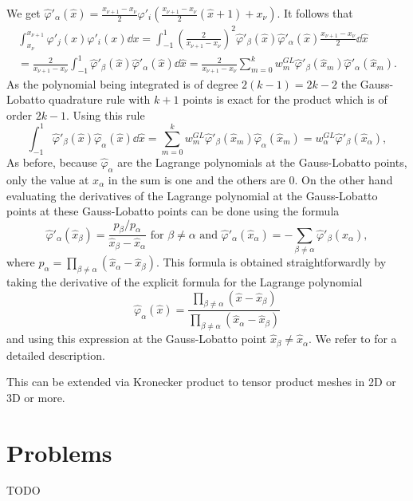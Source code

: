 We get $ \hat{\varphi}'_\alpha(\hat{x}) =\frac{x_{\nu+1}-x_\nu}{2}
 \varphi'_i(\frac{x_{\nu+1}-x_\nu}{2}(\hat{x}+1) +x_\nu)$. 
It follows that
\begin{multline*}
 \int_{x_\nu}^{x_{\nu+1}} \varphi'_j(x)\varphi'_i(x)\dd x = 
 \int_{-1}^1 
\left( \frac{2}{x_{\nu+1}-x_\nu}\right)^2\hat{\varphi}'_\beta(\hat{x})\hat{\varphi}'_\alpha(\hat{x})\frac{x_{\nu+1}-x_\nu}{2}\dd \hat{x}\\
 =\frac{2}{x_{\nu+1}-x_\nu} \int_{-1}^1 
 \hat{\varphi}'_\beta(\hat{x})\hat{\varphi}'_\alpha(\hat{x})\dd \hat{x}=\frac{2}{x_{\nu+1}-x_\nu} \sum_{m=0}^k w^{GL}_m  \hat{\varphi}'_\beta(\hat{x}_m)\hat{\varphi}'_\alpha(\hat{x}_m).
 \end{multline*}
 As the polynomial being integrated is of degree $2(k-1)=2k-2$ the Gauss-Lobatto quadrature rule with $k+1$ points is exact for the product which is of order $2k-1$. Using this rule
$$ \int_{-1}^1  \hat{\varphi}'_\beta(\hat{x})\hat{\varphi}_\alpha(\hat{x})\dd \hat{x}
=\sum_{m=0}^k w^{GL}_m  \hat{\varphi}'_\beta(\hat{x}_m)\hat{\varphi}_\alpha(\hat{x}_m)
=w^{GL}_\alpha  \hat{\varphi}'_\beta(\hat{x}_\alpha),$$
As before, because $\hat{\varphi}_\alpha$ are the Lagrange polynomials at the Gauss-Lobatto points, only the value at $x_\alpha$  in the sum is one and the others are 0.
On the other hand evaluating the derivatives of the Lagrange polynomial at the Gauss-Lobatto points at these Gauss-Lobatto points can be done using the formula
$$\hat{\varphi}'_\alpha(\hat{x}_\beta) = \frac{p_\beta/p_\alpha}{\hat{x}_\beta-\hat{x}_\alpha} \mbox{ for }\beta\neq \alpha \mbox{ and }  \hat{\varphi}'_\alpha(\hat{x}_\alpha)=-\sum_{\beta\neq \alpha} \hat{\varphi}'_\beta(\hat{x}_\alpha),$$
where $p_\alpha= \prod_{\beta\neq\alpha} (\hat{x}_\alpha -\hat{x}_\beta) $. 
This formula is obtained straightforwardly by taking the derivative of the explicit formula for the Lagrange polynomial 
$$ \hat{\varphi}_\alpha(\hat{x})=\frac{\displaystyle \prod_{\beta\neq\alpha} (\hat{x} -\hat{x}_\beta)}{
\displaystyle \prod_{\beta\neq\alpha} (\hat{x}_\alpha -\hat{x}_\beta)}$$
and using this expression at the Gauss-Lobatto point $\hat{x}_\beta\neq \hat{x}_\alpha$. We refer to \cite{berrut2004} for a detailed description.


This can be extended via Kronecker product to tensor product meshes in 2D or 3D or more.

\section{Problems}

\begin{exercise}
  TODO
\end{exercise}

